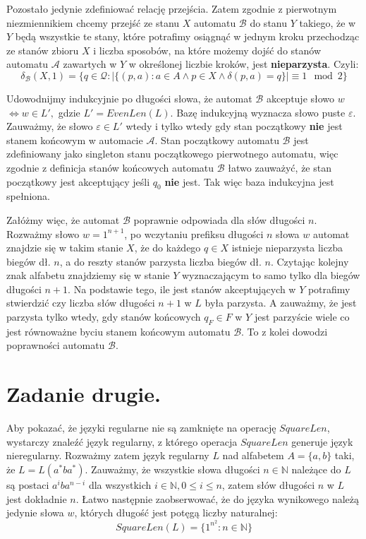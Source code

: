 \documentclass{article}
\begin{document}
Pozostało jedynie zdefiniować relację przejścia. Zatem zgodnie z pierwotnym niezmiennikiem chcemy przejść ze stanu $X$ automatu $\mathcal{B}$ do stanu $Y$ takiego, że w $Y$ będą wszystkie te stany, które potrafimy osiągnąć w jednym kroku przechodząc ze stanów zbioru $X$ i liczba sposobów, na które możemy dojść do stanów automatu $\mathcal{A}$ zawartych w $Y$ w określonej liczbie kroków, jest \textbf{nieparzysta}. Czyli:
$$
\delta_{\mathcal{B}}(X, 1)=\{q \in \mathscr{Q} : |\{(p,a) : a\in A \land p \in X \land \delta(p, a)=q \}| \equiv 1 \mod 2 \}
$$

Udowodnijmy indukcyjnie po długości słowa, że automat $\mathcal{B}$ akceptuje słowo $w$ $\iff w \in L',$ gdzie $L'=EvenLen(L)$. Bazę indukcyjną wyznacza słowo puste $\varepsilon$. Zauważmy, że słowo $\varepsilon \in L'$ wtedy i tylko wtedy gdy stan początkowy \textbf{nie} jest stanem końcowym w automacie $\mathcal{A}$. Stan początkowy automatu $\mathcal{B}$ jest zdefiniowany jako singleton stanu początkowego pierwotnego automatu, więc zgodnie z definicja stanów końcowych automatu $\mathcal{B}$ łatwo zauważyć, że stan początkowy jest akceptujący jeśli $q_0$ \textbf{nie} jest. Tak więc baza indukcyjna jest spełniona.

Załóżmy więc, że automat $\mathcal{B}$ poprawnie odpowiada dla słów długości $n$. Rozważmy słowo $w=1^{n+1}$, po wczytaniu prefiksu długości $n$ słowa $w$ automat znajdzie się w takim stanie $X$, że do każdego $q\in X$ istnieje nieparzysta liczba biegów dł. $n$, a do reszty stanów parzysta liczba biegów dł. $n$. Czytając kolejny znak alfabetu znajdziemy się w stanie $Y$ wyznaczającym to samo tylko dla biegów długości $n+1$. Na podstawie tego, ile jest stanów akceptujących w $Y$ potrafimy stwierdzić czy liczba słów długości $n+1$ w $L$ była parzysta. A zauważmy, że jest parzysta tylko wtedy, gdy stanów końcowych $q_F\in F$ w $Y$ jest parzyście wiele co jest równoważne byciu stanem końcowym automatu $\mathcal{B}$. To z kolei dowodzi poprawności automatu $\mathcal{B}$.

\newpage
\section{Zadanie drugie.}
Aby pokazać, że języki regularne nie są zamknięte na operację $SquareLen$, wystarczy znaleźć język regularny, z którego operacja $SquareLen$ generuje język nieregularny. Rozważmy zatem język regularny $L$ nad alfabetem $A=\{a,b\}$ taki, że $L=L(a^* b a^*)$. Zauważmy, że wszystkie słowa długości $n \in \mathbb{N}$ należące do $L$ są postaci $a^i b a^{n-i}$ dla wszystkich $i \in \mathbb{N}, 0 \leq i \leq n$, zatem słów długości $n$ w $L$ jest dokładnie $n$. Łatwo następnie zaobserwować, że do języka wynikowego należą jedynie słowa $w$, których długość jest potęgą liczby naturalnej:
$$SquareLen(L)=\{1^{n^2}:n \in \mathbb{N}\}$$
\end{document}

